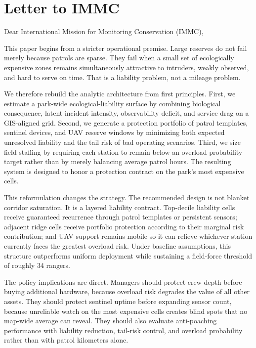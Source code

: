 \newpage

\section*{Letter to IMMC}
Dear International Mission for Monitoring Conservation (IMMC),

This paper begins from a stricter operational premise. Large reserves do not fail merely because patrols are sparse. They fail when a small set of ecologically expensive zones remains simultaneously attractive to intruders, weakly observed, and hard to serve on time. That is a liability problem, not a mileage problem.

We therefore rebuild the analytic architecture from first principles. First, we estimate a park-wide ecological-liability surface by combining biological consequence, latent incident intensity, observability deficit, and service drag on a GIS-aligned grid. Second, we generate a protection portfolio of patrol templates, sentinel devices, and UAV reserve windows by minimizing both expected unresolved liability and the tail risk of bad operating scenarios. Third, we size field staffing by requiring each station to remain below an overload probability target rather than by merely balancing average patrol hours. The resulting system is designed to honor a protection contract on the park's most expensive cells.

This reformulation changes the strategy. The recommended design is not blanket corridor saturation. It is a layered liability contract. Top-decile liability cells receive guaranteed recurrence through patrol templates or persistent sensors; adjacent ridge cells receive portfolio protection according to their marginal risk contribution; and UAV support remains mobile so it can relieve whichever station currently faces the greatest overload risk. Under baseline assumptions, this structure outperforms uniform deployment while sustaining a field-force threshold of roughly 34 rangers.

The policy implications are direct. Managers should protect crew depth before buying additional hardware, because overload risk degrades the value of all other assets. They should protect sentinel uptime before expanding sensor count, because unreliable watch on the most expensive cells creates blind spots that no map-wide average can reveal. They should also evaluate anti-poaching performance with liability reduction, tail-risk control, and overload probability rather than with patrol kilometers alone.


